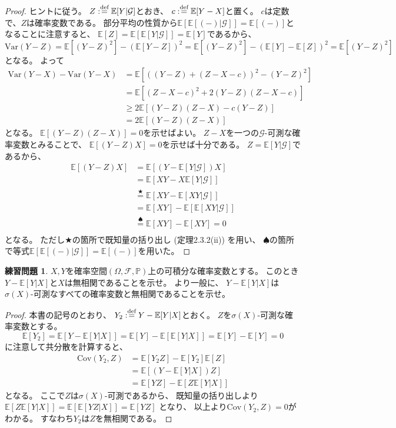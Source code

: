 \documentclass[uplatex]{jsarticle}
\theoremstyle{definition}
\newtheorem{prob}[prob]{練習問題}
\def\P{\mathbb{P}}
\def\E{\mathbb{E}}
\def\mcF{\mathcal{F}}
\def\mcG{\mathcal{G}}
\def\dfn{:\overset{\mbox{{\scriptsize def}}}{=}}
\newcommand{\Var}{\mathrm{Var}}
\newcommand{\Cov}{\mathrm{Cov}}
\begin{document}
\begin{proof}
  ヒントに従う。
  \(Z\dfn \E[Y|\mcG]\)とおき、
  \(c\dfn \E[Y-X]\)と置く。
  \(c\)は定数で、\(Z\)は確率変数である。
  部分平均の性質から\(\E[\E[(-)|\mcG]] = \E[(-)]\)となることに注意すると、
  \(\E[Z]=\E[\E[Y|\mcG]] = \E[Y]\)であるから、
  \[
  \Var(Y-Z) = \E[(Y-Z)^2] - (\E[Y-Z])^2
  = \E[(Y-Z)^2] - (\E[Y]-\E[Z])^2
  = \E[(Y-Z)^2]
  \]
  となる。
  よって
  \begin{align*}
    \Var(Y-X) - \Var(Y-X)
    &= \E[ ((Y-Z)+(Z-X-c))^2 - (Y-Z)^2] \\
    &= \E[ (Z-X-c)^2 + 2(Y-Z)(Z-X-c)] \\
    &\geq 2\E[(Y-Z)(Z-X) - c(Y-Z)] \\
    &= 2\E[(Y-Z)(Z-X)]
  \end{align*}
  となる。
  \(\E[(Y-Z)(Z-X)]=0\)を示せばよい。
  \(Z-X\)を一つの\(\mcG\)-可測な確率変数とみることで、
  \(\E[(Y-Z)X]=0\)を示せば十分である。
  \(Z=\E[Y|\mcG]\)であるから、
  \begin{align*}
    \E[(Y-Z)X]
    &= \E[(Y-\E[Y|\mcG])X] \\
    &= \E[XY-X\E[Y|\mcG]] \\
    &\overset{\bigstar}{=} \E[XY-\E[XY|\mcG]] \\
    &= \E[XY]-\E[\E[XY|\mcG]] \\
    &\overset{\spadesuit}{=} \E[XY]-\E[XY] = 0 \\
  \end{align*}
  となる。
  ただし\(\bigstar\)の箇所で既知量の括り出し (定理2.3.2(ii)) を用い、
  \(\spadesuit\)の箇所で等式\(\E[\E[(-)|\mcG]]=\E[(-)]\)を用いた。
\end{proof}


\begin{prob}\label{prob: 2.8}
  \(X,Y\)を確率空間\((\Omega,\mcF,\P)\)上の可積分な確率変数とする。
  このとき\(Y-\E[Y|X]\)と\(X\)は無相関であることを示せ。
  より一般に、
  \(Y-\E[Y|X]\)は\(\sigma(X)\)-可測なすべての確率変数と無相関であることを示せ。
\end{prob}

\begin{proof}
  本書の記号のとおり、
  \(Y_2 \dfn Y-\E[Y|X]\)とおく。
  \(Z\)を\(\sigma(X)\)-可測な確率変数とする。
  \[\E[Y_2] = \E[Y-\E[Y|X]] = \E[Y]-\E[\E[Y|X]] = \E[Y]-\E[Y] = 0\]
  に注意して共分散を計算すると、
  \begin{align*}
    \Cov(Y_2,Z) &= \E[Y_2Z] - \E[Y_2]\E[Z] \\
    &= \E[(Y-\E[Y|X])Z] \\
    &= \E[YZ] - \E[Z\E[Y|X]]
  \end{align*}
  となる。
  ここで\(Z\)は\(\sigma(X)\)-可測であるから、
  既知量の括り出しより
  \(\E[Z\E[Y|X]] = \E[\E[YZ|X]] = \E[YZ]\)
  となり、
  以上より\(\Cov(Y_2,Z) = 0\)がわかる。
  すなわち\(Y_2\)は\(Z\)を無相関である。
\end{proof}
\end{document}
